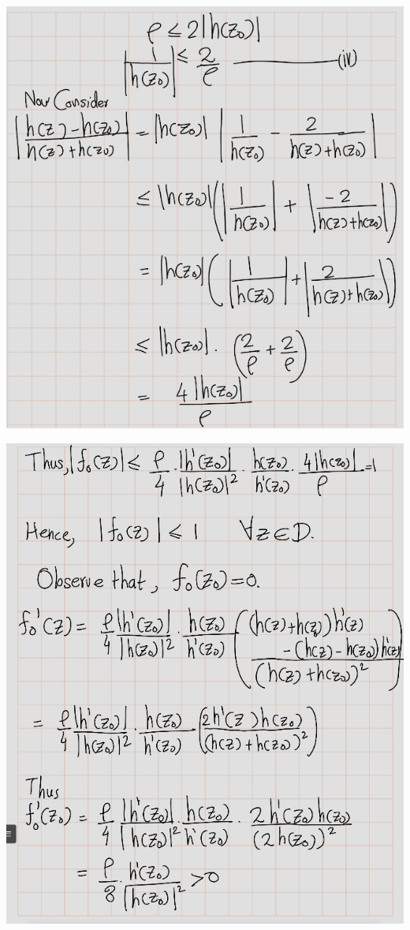 \documentclass[
]{book}
\theoremstyle{definition}
\theoremstyle{definition}
\theoremstyle{definition}
\theoremstyle{definition}
\theoremstyle{remark}
\begin{document}
\begin{center}\includegraphics[width=8.79in]{figures/Riemann_Mapping_Therom/fig9} \end{center}

\begin{center}\includegraphics[width=9.1in]{figures/Riemann_Mapping_Therom/fig10} \end{center}
\end{document}
